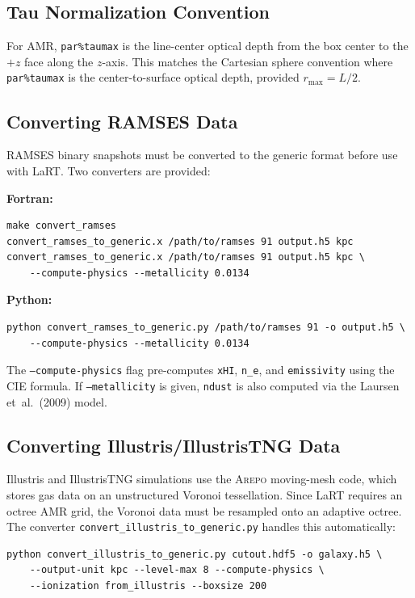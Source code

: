 \documentclass[english,a4paper]{my_memo}
\newcommand{\parm}[1]{\texttt{par\%#1}}
\begin{document}
\subsection{Tau Normalization Convention}

For AMR, \parm{taumax} is the line-center optical depth from the box center to the
$+z$ face along the $z$-axis.  This matches the Cartesian sphere convention where
\parm{taumax} is the center-to-surface optical depth, provided $r_\text{max} = L/2$.

\subsection{Converting RAMSES Data}

RAMSES binary snapshots must be converted to the generic format before use
with LaRT.  Two converters are provided:

\textbf{Fortran:}
\begin{lstlisting}[language={}]
make convert_ramses
convert_ramses_to_generic.x /path/to/ramses 91 output.h5 kpc
convert_ramses_to_generic.x /path/to/ramses 91 output.h5 kpc \
    --compute-physics --metallicity 0.0134
\end{lstlisting}

\textbf{Python:}
\begin{lstlisting}[language={}]
python convert_ramses_to_generic.py /path/to/ramses 91 -o output.h5 \
    --compute-physics --metallicity 0.0134
\end{lstlisting}

The \texttt{--compute-physics} flag pre-computes \texttt{xHI}, \texttt{n\_e},
and \texttt{emissivity} using the CIE formula.  If \texttt{--metallicity} is
given, \texttt{ndust} is also computed via the Laursen et~al.\ (2009) model.

\subsection{Converting Illustris/IllustrisTNG Data}
\label{sec:illustris}

Illustris and IllustrisTNG simulations use the \textsc{Arepo} moving-mesh
code, which stores gas data on an unstructured Voronoi tessellation.
Since LaRT requires an octree AMR grid, the Voronoi data must be
resampled onto an adaptive octree.  The converter
\texttt{convert\_illustris\_to\_generic.py} handles this automatically:

\begin{lstlisting}[language={}]
python convert_illustris_to_generic.py cutout.hdf5 -o galaxy.h5 \
    --output-unit kpc --level-max 8 --compute-physics \
    --ionization from_illustris --boxsize 200
\end{lstlisting}
\end{document}
